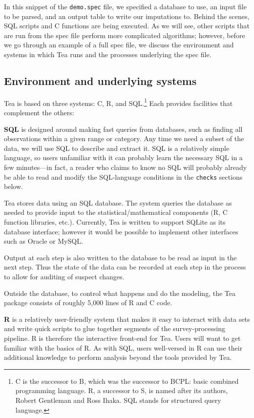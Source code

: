 \documentclass{article}
\begin{document}
In this snippet of the {\tt demo.spec} file, we specified a database to use, an input
file to be parsed, and an output table to write our imputations to. Behind the scenes,
SQL scripts and C functions are being executed. As we will see, other scripts that
are run from the spec file perform more complicated algorithms; however, before we
go through an example of a full spec file, we discuss the environment and systems in
which Tea runs and the processes underlying the spec file.

\subsection{Environment and underlying systems}
Tea is based on three systems: C, R, and SQL.\footnote{C is the successor to B, which
was the successor to BCPL: basic combined programming language. R, a successor to S,
is named after its authors, Robert Gentleman and Ross Ihaka. SQL stands for structured
query language.} Each provides facilities that complement the others:

{\bf SQL} is designed around making fast queries from databases, such as finding all
observations within a given range or category. Any time we need a subset of the data,
we will use SQL to describe and extract it. SQL is a relatively simple language, so
users unfamiliar with it can probably learn the necessary SQL in a few minutes---in
fact, a reader who claims to know no SQL will probably already be able to read and
modify the SQL-language conditions in the {\tt checks} sections below.

Tea stores data using an SQL database. The system queries the database as needed to
provide input to the statistical/mathematical components (R, C function libraries,
etc.).  Currently, Tea is written to support SQLite as its database interface; however
it would be possible to implement other interfaces such as Oracle or MySQL.

Output at each step is also written to the database to be read as input in the next
step. Thus the state of the data can be recorded at each step in the process to allow
for auditing of suspect changes.

Outside the database, to control what happens and do the modeling, the Tea package
consists of roughly 5,000 lines of R and C code.

{\bf R} is a relatively user-friendly system that makes it easy to interact with data
sets and write quick scripts to glue together segments of the survey-processing pipeline.
R is therefore the interactive front-end for Tea. Users will want to get familiar with
the basics of R.  As with SQL, users well-versed in R can use their additional
knowledge to perform analysis beyond the tools provided by Tea.
\end{document}
